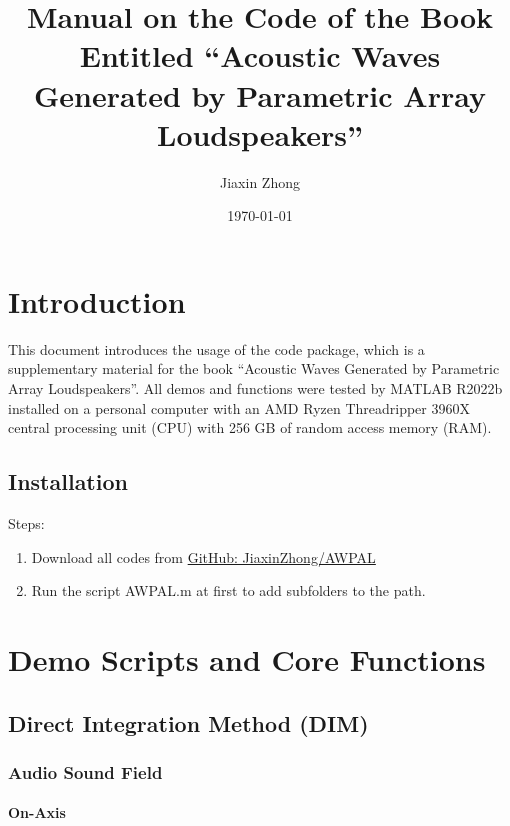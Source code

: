 \documentclass[12pt]{article}
\title{Manual on the Code of the Book Entitled ``Acoustic Waves Generated by Parametric Array Loudspeakers''}
\author{Jiaxin Zhong}
\date{\today}
\begin{document}
\maketitle

\tableofcontents


\section{Introduction}
This document introduces the usage of the code package, which is a supplementary material for the book ``Acoustic Waves Generated by Parametric Array Loudspeakers''.
All demos and functions were tested by MATLAB R2022b installed on a personal computer with an AMD Ryzen Threadripper 3960X central processing unit (CPU) with 256 GB of random access memory (RAM).

\subsection{Installation}

Steps:
\begin{enumerate}
    \item Download all codes from \href{https://github.com/JiaxinZhong/AWPAL/}{GitHub: JiaxinZhong/AWPAL}
    \item Run the script AWPAL.m at first to add subfolders to the path.
\end{enumerate}





\section{Demo Scripts and Core Functions}

\subsection{Direct Integration Method (DIM)}

\subsubsection{Audio Sound Field}

\paragraph{On-Axis}
\end{document}
